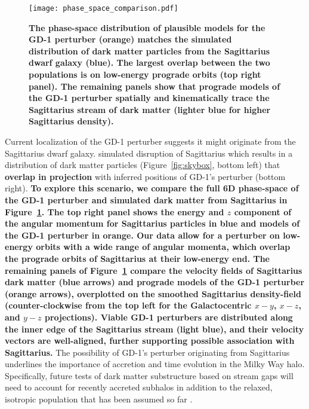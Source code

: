 \documentclass[twocolumn]{aastex63}
\newcommand{\changes}[1]{{\textbf{#1}}}
\begin{document}
\begin{figure}
\begin{center}
\texttt{[image: phase\_space\_comparison.pdf]}
\end{center}
\caption{\changes{The phase-space distribution of plausible models for the GD-1 perturber (orange) matches the simulated distribution of dark matter particles from the Sagittarius dwarf galaxy (blue).
The largest overlap between the two populations is on low-energy prograde orbits (top right panel).
The remaining panels show that prograde models of the GD-1 perturber spatially and kinematically trace the Sagittarius stream of dark matter (lighter blue for higher Sagittarius density).}
}
\label{fig:phasespace}
\end{figure}

Current localization of the GD-1 perturber suggests it might originate from the Sagittarius dwarf galaxy.
\citet{dl2017} simulated disruption of Sagittarius which results in a distribution of dark matter particles (Figure~\ref{fig:skybox}, bottom left) that \changes{overlap in projection} with inferred positions of GD-1's perturber (bottom right).
\changes{
To explore this scenario, we compare the full 6D phase-space of the GD-1 perturber and simulated dark matter from Sagittarius in Figure~\ref{fig:phasespace}.
The top right panel shows the energy and $z$ component of the angular momentum for Sagittarius particles in blue and models of the GD-1 perturber in orange.
Our data allow for a perturber on low-energy orbits with a wide range of angular momenta, which overlap the prograde orbits of Sagittarius at their low-energy end.
The remaining panels of Figure~\ref{fig:phasespace} compare the velocity fields of Sagittarius dark matter (blue arrows) and prograde models of the GD-1 perturber (orange arrows), overplotted on the smoothed Sagittarius density-field (counter-clockwise from the top left for the Galactocentric $x-y$, $x-z$, and $y-z$ projections).
Viable GD-1 perturbers are distributed along the inner edge of the Sagittarius stream (light blue), and their velocity vectors are well-aligned, further supporting possible association with Sagittarius.
}
The possibility of GD-1's perturber originating from Sagittarius underlines the importance of accretion and time evolution in the Milky Way halo.
Specifically, future tests of dark matter substructure based on stream gaps will need to account for recently accreted subhalos in addition to the relaxed, isotropic population that has been assumed so far \citep[e.g.,][]{erkal2016, banik2019}.
\end{document}
